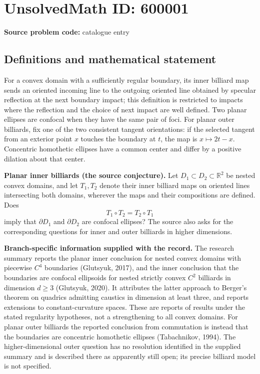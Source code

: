 \documentclass[11pt]{article}
\begin{document}
\section*{UnsolvedMath ID: 600001}
\textbf{Source problem code:} catalogue entry
\subsection{Definitions and mathematical statement}
For a convex domain with a sufficiently regular boundary, its inner billiard map sends an oriented incoming line to the outgoing oriented line obtained by specular reflection at the next boundary impact; this definition is restricted to impacts where the reflection and the choice of next impact are well defined. Two planar ellipses are confocal when they have the same pair of foci. For planar outer billiards, fix one of the two consistent tangent orientations: if the selected tangent from an exterior point $x$ touches the boundary at $t$, the map is $x\mapsto 2t-x$. Concentric homothetic ellipses have a common center and differ by a positive dilation about that center.

\textbf{Planar inner billiards (the source conjecture).} Let $D_1\subset D_2\subset\mathbb R^2$ be nested convex domains, and let $T_1,T_2$ denote their inner billiard maps on oriented lines intersecting both domains, wherever the maps and their compositions are defined. Does
\[
T_1\circ T_2=T_2\circ T_1
\]
imply that $\partial D_1$ and $\partial D_2$ are confocal ellipses? The source also asks for the corresponding questions for inner and outer billiards in higher dimensions.

\textbf{Branch-specific information supplied with the record.} The research summary reports the planar inner conclusion for nested convex domains with piecewise $C^4$ boundaries (Glutsyuk, 2017), and the inner conclusion that the boundaries are confocal ellipsoids for nested strictly convex $C^2$ billiards in dimension $d\geq3$ (Glutsyuk, 2020). It attributes the latter approach to Berger's theorem on quadrics admitting caustics in dimension at least three, and reports extensions to constant-curvature spaces. These are reports of results under the stated regularity hypotheses, not a strengthening to all convex domains. For planar outer billiards the reported conclusion from commutation is instead that the boundaries are concentric homothetic ellipses (Tabachnikov, 1994). The higher-dimensional outer question has no resolution identified in the supplied summary and is described there as apparently still open; its precise billiard model is not specified.
\end{document}
